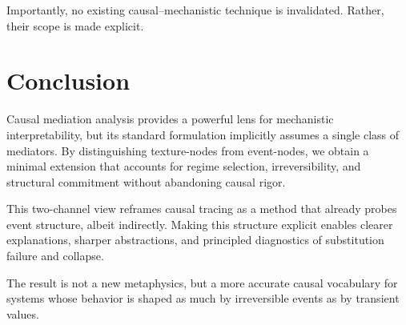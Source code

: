 \documentclass[11pt]{article}
\theoremstyle{remark}
\begin{document}
Importantly, no existing causal–mechanistic technique is invalidated. Rather, their scope is made explicit.

\section{Conclusion}

Causal mediation analysis provides a powerful lens for mechanistic interpretability, but its standard formulation implicitly assumes a single class of mediators. By distinguishing texture-nodes from event-nodes, we obtain a minimal extension that accounts for regime selection, irreversibility, and structural commitment without abandoning causal rigor.

This two-channel view reframes causal tracing as a method that already probes event structure, albeit indirectly. Making this structure explicit enables clearer explanations, sharper abstractions, and principled diagnostics of substitution failure and collapse.

The result is not a new metaphysics, but a more accurate causal vocabulary for systems whose behavior is shaped as much by irreversible events as by transient values.
\end{document}
